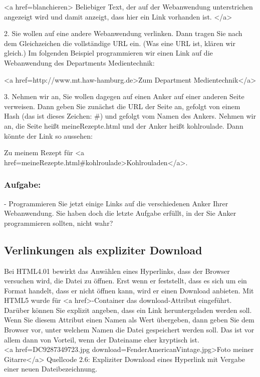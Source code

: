 <a href=blanchieren> Beliebiger Text, der auf der Webanwendung unterstrichen angezeigt wird und damit anzeigt, dass hier ein Link vorhanden ist. </a>

2.	Sie wollen auf eine andere Webanwendung verlinken. Dann tragen Sie nach dem Gleichzeichen die vollständige URL ein. (Was eine URL ist, klären wir gleich.) Im folgenden Beispiel programmieren wir einen Link auf die Webanwendung des Departments Medientechnik:

<a href=http://www.mt.haw-hamburg.de>Zum Department Medientechnik</a>

3.	Nehmen wir an, Sie wollen dagegen auf einen Anker auf einer anderen Seite verweisen. Dann geben Sie zunächst die URL der Seite an, gefolgt von einem Hash (das ist dieses Zeichen: \#) und gefolgt vom Namen des Ankers. Nehmen wir an, die Seite heißt meineRezepte.html und der Anker heißt kohlroulade. Dann könnte der Link so aussehen:

Zu meinem Rezept für <a href=meineRezepte.html\#kohlroulade>Kohlrouladen</a>.

\subsubsection{Aufgabe:}

-	Programmieren Sie jetzt einige Links auf die verschiedenen Anker Ihrer Webanwendung.
Sie haben doch die letzte Aufgabe erfüllt, in der Sie Anker programmieren sollten, nicht wahr?

\subsection{Verlinkungen als expliziter Download}

Bei HTML4.01 bewirkt das Anwählen eines Hyperlinks, dass der Browser versuchen wird, die Datei zu öffnen. Erst wenn er feststellt, dass es sich um ein Format handelt, dass er nicht öffnen kann, wird er einen Download anbieten. Mit HTML5 wurde für <a href>-Container das download-Attribut eingeführt. Darüber können Sie explizit angeben, dass ein Link heruntergeladen werden soll.\\

Wenn Sie diesem Attribut einen Namen als Wert übergeben, dann geben Sie dem Browser vor, unter welchem Namen die Datei gespeichert werden soll. Das ist vor allem dann von Vorteil, wenn der Dateiname eher kryptisch ist.\\


<a href=DC9287349723.jpg download=FenderAmericanVintage.jpg>Foto meiner Gitarre</a>
Quellcode 2.6: Expliziter Download eines Hyperlink mit Vergabe einer neuen Dateibezeichnung.


